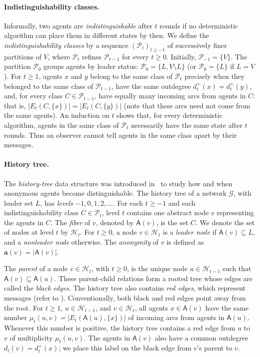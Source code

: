 \documentclass[11pt]{article}
\newcommand{\anon}{\mathbf a}
\newcommand{\agents}{\mathsf A}
\begin{document}
\paragraph{Indistinguishability classes.}
Informally, two agents are \emph{indistinguishable} after \(t\) rounds if no
deterministic algorithm can place them in different states by then.
We define the \emph{indistinguishability classes} by a sequence
\((\mathcal P_t)_{t\geq-1}\) of successively finer partitions of \(V\), where
\(\mathcal P_t\) refines \(\mathcal P_{t-1}\) for every \(t\geq0\).
Initially, \(\mathcal P_{-1}=\{V\}\). The partition \(\mathcal P_0\) groups agents by
leader status: \(\mathcal P_0=\{L,V\setminus L\}\) (or
\(\mathcal P_0=\{L\}\) if \(L=V\)). For \(t\geq1\), agents \(x\)
and \(y\) belong to the same class of \(\mathcal P_t\) precisely when they
belonged to the same class of \(\mathcal P_{t-1}\), have the same
outdegree \(d_t^+(x)=d_t^+(y)\), and, for every class
\(C\in\mathcal P_{t-1}\), have equally many incoming arcs from agents
in \(C\): that is, \(|E_t(C,\{x\})|=|E_t(C,\{y\})|\) (note that these arcs need not come from the same agents).
An induction on \(t\) shows that, for every deterministic algorithm,
agents in the same class of \(\mathcal P_t\) necessarily have the same state
after \(t\) rounds. Thus an observer cannot tell agents in the same class apart
by their messages.

\paragraph{History tree.}
The \emph{history-tree} data structure was introduced in~\cite{DV22} to study
how and when anonymous agents become distinguishable. The history tree of
a network \(\mathcal G\), with leader set \(L\), has \emph{levels}
\(-1,0,1, 2,\ldots\). For each \(t\geq-1\) and
each indistinguishability class \(C\in\mathcal P_t\), level \(t\) contains one abstract node \(v\) representing the agents in \(C\). The \emph{fiber} of \(v\), denoted by
\(\agents(v)\), is the set \(C\). We denote the set of nodes at level \(t\)
by \(\mathcal H_t\). For \(t\geq0\), a node \(v\in\mathcal H_t\) is a
\emph{leader node} if \(\agents(v)\subseteq L\), and a \emph{nonleader node}
otherwise. The \emph{anonymity} of \(v\) is defined as \(\anon(v)=|\agents(v)|\).

The \emph{parent} of a node \(v\in\mathcal H_t\), with \(t\geq0\),
is the unique node \(u\in\mathcal H_{t-1}\) such that
\(\agents(v)\subseteq\agents(u)\). These parent-child relations form
a rooted tree whose edges are called the \emph{black edges}.
The history tree also contains \emph{red edges}, which represent messages (refer to ). Conventionally, both black and red edges point away from the root.
For \(t\geq1\), \(u\in\mathcal H_{t-1}\), and \(v\in\mathcal H_t\),
all agents \(x\in\agents(v)\) have the same number
\(\mu_t(u,v)=|E_t(\agents(u),\{x\})|\) of incoming arcs from agents
in \(\agents(u)\). Whenever this number is positive, the history tree
contains a red edge from \(u\) to \(v\) of multiplicity \(\mu_t(u,v)\).
The agents in \(\agents(v)\) also have a common outdegree
\(d_t(v)=d_t^+(x)\); we place this label on the black edge from \(v\)'s
parent to \(v\).
\end{document}
